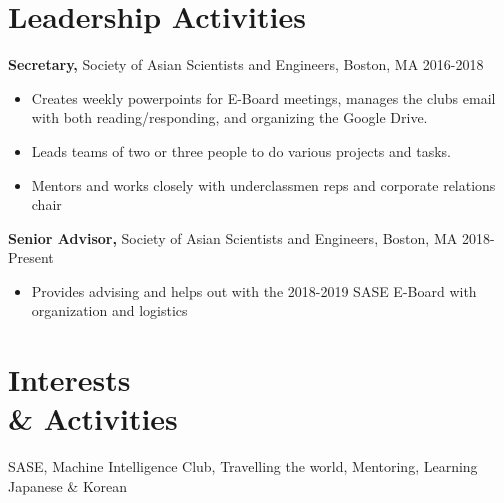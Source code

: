 \documentclass[margin]{res}
\begin{document}
\begin{resume}
\section{Leadership   Activities} 
               {\bf Secretary,} Society of Asian Scientists and Engineers, Boston, MA    \hfill         2016-2018
                \begin{itemize} \itemsep -0.5pt
                \item Creates weekly powerpoints for E-Board meetings, manages the clubs email with both reading/responding, and organizing the Google Drive.
                \item Leads teams of two or three people to do various projects and tasks.
              \item Mentors and works closely with underclassmen reps and corporate relations chair

		 \end{itemize}
            {\bf Senior Advisor,} Society of Asian Scientists and Engineers, Boston, MA \hfill 2018-Present
            \begin{itemize} \itemsep -0.5pt
                \item Provides advising and helps out with the 2018-2019 SASE E-Board with organization and logistics 
            \end{itemize}

 
\section{Interests \\ \& Activities}
SASE, Machine Intelligence Club, Travelling the world, Mentoring, Learning Japanese \& Korean
\end{resume} 
\end{document}
